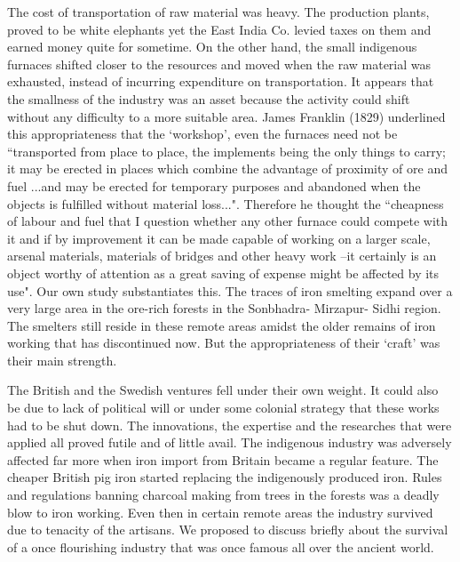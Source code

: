 The cost of transportation of raw material was heavy. The production plants, proved to be white elephants yet the East India Co. levied taxes on them and earned money quite for sometime. On the other hand, the small indigenous furnaces shifted closer to the resources and moved when the raw material was exhausted, instead of incurring expenditure on transportation. It appears that the smallness of the industry was an asset because the activity could shift without any difficulty to a more suitable area. James Franklin (1829) underlined this appropriateness that the `workshop', even the furnaces need not be \footnotesize{``transported from place to place, the implements being the only things to carry; it may be erected in places which combine the advantage of proximity of ore and fuel ...and may be erected for temporary purposes and abandoned when the objects is fulfilled without material loss..."}. Therefore he thought the \footnotesize{``cheapness of labour and fuel that I question whether any other furnace could compete with it and if by improvement it can be made capable of working on a larger scale, arsenal materials, materials of bridges and other heavy work –it certainly is an object worthy of attention as a great saving of expense might be affected by its use"}. Our own study substantiates this. The traces of iron smelting expand over a very large area in the ore-rich forests in the Sonbhadra- Mirzapur- Sidhi region. The smelters still reside in these remote areas amidst the older remains of iron working that has discontinued now. But the appropriateness of their `craft' was their main strength. 

The British and the Swedish ventures fell under their own weight. It could also be due to lack of political will or under some colonial strategy that these works had to be shut down. The innovations, the expertise and the researches that were applied all proved futile and of little avail. The indigenous industry was adversely affected far more when iron import from Britain became a regular feature. The cheaper British pig iron started replacing the indigenously produced iron. Rules and regulations banning charcoal making from trees in the forests was a deadly blow to iron working. Even then in certain remote areas the industry survived due to tenacity of the artisans. We proposed to discuss briefly about the survival of a once flourishing industry that was once famous all over the ancient world.


\theendnotes

\label{endchapter6}

